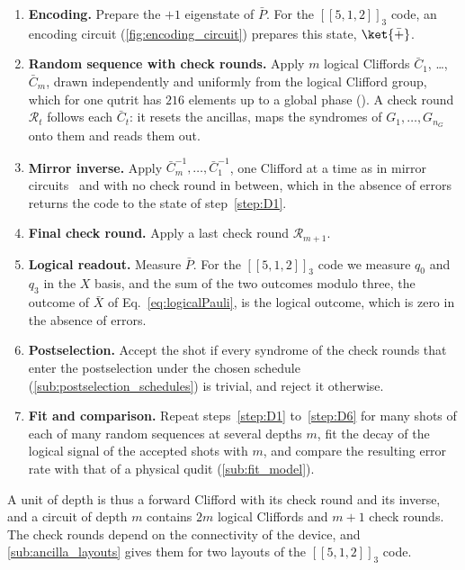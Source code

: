 \begin{enumerate}[label=\textbf{D\arabic*.}, ref=D\arabic*, leftmargin=2.1em, labelsep=0.4em, itemsep=1pt, topsep=3pt]
  \item\label{step:D1} \textbf{Encoding.} Prepare the $+1$ eigenstate of $\bar P$. For the $[[5,1,2]]_3$ code, an encoding circuit (\autoref{fig:encoding_circuit}) prepares this state, $\ket{\bar{+}}$.
  \item\label{step:D2} \textbf{Random sequence with check rounds.} Apply $m$ logical Cliffords $\bar C_1$, \dots, $\bar C_m$, drawn independently and uniformly from the logical Clifford group, which for one qutrit has $216$ elements up to a global phase (). A check round $\mathcal{R}_t$ follows each $\bar C_t$: it resets the ancillas, maps the syndromes of $G_1, \dots, G_{n_G}$ onto them and reads them out.
  \item\label{step:D3} \textbf{Mirror inverse.} Apply $\bar C_m^{-1}, \dots, \bar C_1^{-1}$, one Clifford at a time as in mirror circuits~\cite{Proctor2022MirrorRB} and with no check round in between, which in the absence of errors returns the code to the state of step~\ref{step:D1}.
  \item\label{step:D4} \textbf{Final check round.} Apply a last check round $\mathcal{R}_{m+1}$.
  \item\label{step:D5} \textbf{Logical readout.} Measure $\bar P$. For the $[[5,1,2]]_3$ code we measure $q_0$ and $q_3$ in the $X$ basis, and the sum of the two outcomes modulo three, the outcome of $\bar X$ of Eq.~\eqref{eq:logicalPauli}, is the logical outcome, which is zero in the absence of errors.
  \item\label{step:D6} \textbf{Postselection.} Accept the shot if every syndrome of the check rounds that enter the postselection under the chosen schedule (\autoref{sub:postselection_schedules}) is trivial, and reject it otherwise.
  \item\label{step:D7} \textbf{Fit and comparison.} Repeat steps~\ref{step:D1} to~\ref{step:D6} for many shots of each of many random sequences at several depths $m$, fit the decay of the logical signal of the accepted shots with $m$, and compare the resulting error rate with that of a physical qudit (\autoref{sub:fit_model}).
\end{enumerate}
A unit of depth is thus a forward Clifford with its check round and its inverse, and a circuit of depth $m$ contains $2m$ logical Cliffords and $m+1$ check rounds. The check rounds depend on the connectivity of the device, and \autoref{sub:ancilla_layouts} gives them for two layouts of the $[[5,1,2]]_3$ code.


